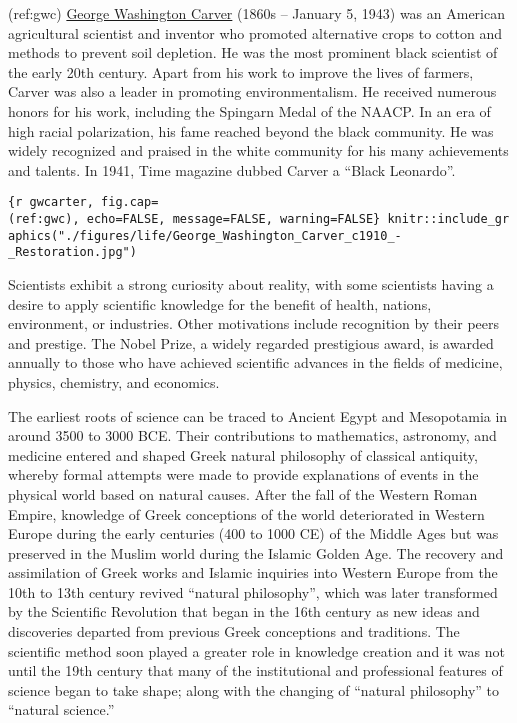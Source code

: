\documentclass[
]{article}
\begin{document}
(ref:gwc)
\href{https://en.wikipedia.org/wiki/George_Washington_Carver}{George
Washington Carver} (1860s -- January 5, 1943) was an American
agricultural scientist and inventor who promoted alternative crops to
cotton and methods to prevent soil depletion. He was the most prominent
black scientist of the early 20th century. Apart from his work to
improve the lives of farmers, Carver was also a leader in promoting
environmentalism. He received numerous honors for his work, including
the Spingarn Medal of the NAACP. In an era of high racial polarization,
his fame reached beyond the black community. He was widely recognized
and praised in the white community for his many achievements and
talents. In 1941, Time magazine dubbed Carver a ``Black Leonardo''.

\texttt{\{r\ gwcarter,\ fig.cap=\textquotesingle{}(ref:gwc)\textquotesingle{},\ echo=FALSE,\ message=FALSE,\ warning=FALSE\}\ knitr::include\_graphics("./figures/life/George\_Washington\_Carver\_c1910\_-\_Restoration.jpg")}

Scientists exhibit a strong curiosity about reality, with some
scientists having a desire to apply scientific knowledge for the benefit
of health, nations, environment, or industries. Other motivations
include recognition by their peers and prestige. The Nobel Prize, a
widely regarded prestigious award, is awarded annually to those who have
achieved scientific advances in the fields of medicine, physics,
chemistry, and economics.

The earliest roots of science can be traced to Ancient Egypt and
Mesopotamia in around 3500 to 3000 BCE. Their contributions to
mathematics, astronomy, and medicine entered and shaped Greek natural
philosophy of classical antiquity, whereby formal attempts were made to
provide explanations of events in the physical world based on natural
causes. After the fall of the Western Roman Empire, knowledge of Greek
conceptions of the world deteriorated in Western Europe during the early
centuries (400 to 1000 CE) of the Middle Ages but was preserved in the
Muslim world during the Islamic Golden Age. The recovery and
assimilation of Greek works and Islamic inquiries into Western Europe
from the 10th to 13th century revived ``natural philosophy'', which was
later transformed by the Scientific Revolution that began in the 16th
century as new ideas and discoveries departed from previous Greek
conceptions and traditions. The scientific method soon played a greater
role in knowledge creation and it was not until the 19th century that
many of the institutional and professional features of science began to
take shape; along with the changing of ``natural philosophy'' to
``natural science.''
\end{document}

